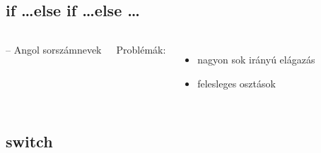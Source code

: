 \documentclass[usenames,dvipsnames,aspectratio=169]{beamer}
\begin{document}
\subsection{if \dots else if \dots else \dots}
\begin{frame}
  \begin{columns}[c]
      \begin{exampleblock}{ -- Angol sorszámnevek}
        \vspace{-.2cm}
        \scriptsize
        
        \vspace{-.2cm}
      \end{exampleblock}
      Problémák: \begin{itemize}
        \item nagyon sok irányú elágazás
        \item felesleges osztások
      \end{itemize}
  \end{columns}
\end{frame}

\subsection{switch}
\begin{frame}
  \begin{exampleblock}{}
    \vspace{-.2cm}
    
    \vspace{-.2cm}
  \end{exampleblock}
\end{frame}
\end{document}
